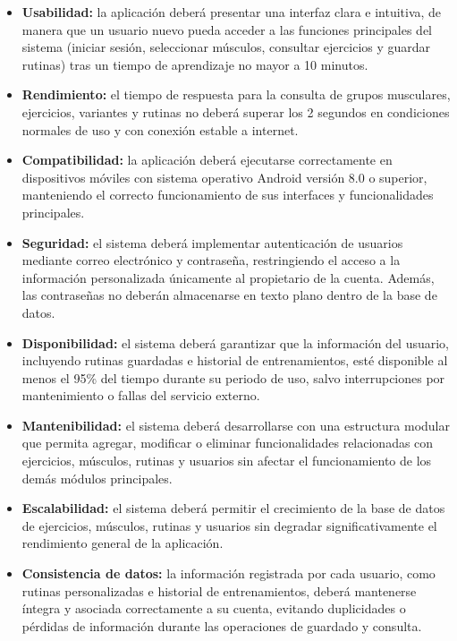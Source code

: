 \begin{itemize}
    \item \textbf{Usabilidad:} la aplicación deberá presentar una interfaz clara e intuitiva, de manera que un usuario nuevo pueda acceder a las funciones principales del sistema (iniciar sesión, seleccionar músculos, consultar ejercicios y guardar rutinas) tras un tiempo de aprendizaje no mayor a 10 minutos.
    
    \item \textbf{Rendimiento:} el tiempo de respuesta para la consulta de grupos musculares, ejercicios, variantes y rutinas no deberá superar los 2 segundos en condiciones normales de uso y con conexión estable a internet.
    
    \item \textbf{Compatibilidad:} la aplicación deberá ejecutarse correctamente en dispositivos móviles con sistema operativo Android versión 8.0 o superior, manteniendo el correcto funcionamiento de sus interfaces y funcionalidades principales.
    
    \item \textbf{Seguridad:} el sistema deberá implementar autenticación de usuarios mediante correo electrónico y contraseña, restringiendo el acceso a la información personalizada únicamente al propietario de la cuenta. Además, las contraseñas no deberán almacenarse en texto plano dentro de la base de datos.
    
    \item \textbf{Disponibilidad:} el sistema deberá garantizar que la información del usuario, incluyendo rutinas guardadas e historial de entrenamientos, esté disponible al menos el 95\% del tiempo durante su periodo de uso, salvo interrupciones por mantenimiento o fallas del servicio externo.
    
    \item \textbf{Mantenibilidad:} el sistema deberá desarrollarse con una estructura modular que permita agregar, modificar o eliminar funcionalidades relacionadas con ejercicios, músculos, rutinas y usuarios sin afectar el funcionamiento de los demás módulos principales.
    
    \item \textbf{Escalabilidad:} el sistema deberá permitir el crecimiento de la base de datos de ejercicios, músculos, rutinas y usuarios sin degradar significativamente el rendimiento general de la aplicación.
    
    \item \textbf{Consistencia de datos:} la información registrada por cada usuario, como rutinas personalizadas e historial de entrenamientos, deberá mantenerse íntegra y asociada correctamente a su cuenta, evitando duplicidades o pérdidas de información durante las operaciones de guardado y consulta.
\end{itemize}